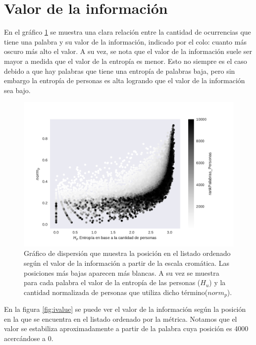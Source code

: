\section{Valor de la información}
\label{sec:ValorDeLaInformacion}
En el gráfico \ref{fig:infoValue} se muestra una clara relación entre la cantidad de ocurrencias que tiene una palabra y su valor de la información, indicado por el colo: cuanto más oscuro más alto el valor. A su vez, se nota que el valor de la información suele ser mayor a medida que el valor de la entropía es menor. Esto no siempre es el caso debido a que hay palabras que tiene una entropía de palabras baja, pero sin embargo la entropía de personas es alta logrando que el valor de la información sea bajo.

\begin{figure}[ht]
\centering
\includegraphics[width=1.0\textwidth]{./images/entropiaPersonasxNormCantPersonas.pdf}
\caption{Gráfico de dispersión que muestra la posición en el listado ordenado según el valor de la información a partir de la escala cromática. Las posiciones más bajas aparecen más blancas. A su vez se muestra para cada palabra el valor de la entropía de las personas ($H_u$) y la cantidad normalizada de personas que utiliza dicho término($norm_p$). } 
\label{fig:infoValue} 
\end{figure}

En la figura \ref{fig:ivalue} se puede ver el valor de la información según la posición en la que se encuentra en el listado ordenado por la métrica. Notamos que el valor se estabiliza aproximadamente a partir de la palabra cuya posición es 4000 acercándose a 0.


